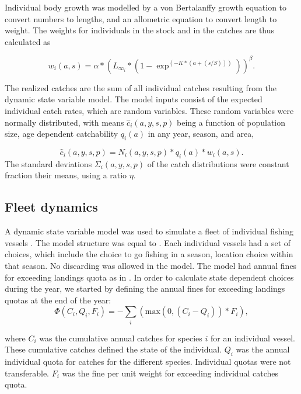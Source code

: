 \documentclass[12pt,oneline,a4paper,numbib]{ouparticle}
\numberwithin{equation}{subsection} %
\begin{document}
Individual body growth was modelled by a von Bertalanffy growth equation to convert numbers to lengths, and an allometric equation to convert length to weight. The weights for individuals in the stock and in the catches are thus calculated as

\begin{equation}
w_i(a,s) = \alpha * ( L_{\infty_i} * (1-\exp^{(-K * (a+(s/S)))}))^{\beta}.
\end{equation}

The realized catches are the sum of all individual catches resulting from the dynamic state variable model. The model inputs consist of the expected individual catch rates, which are random variables. These random variables were normally distributed, with means $\hat c_i (a, y, s, p)$ being a function of population size, age dependent catchability $q_i (a)$ in any year, season, and area,

\begin{equation}
\hat c_i (a, y, s, p) = N_i (a, y, s, p) * q_i (a) * w_i(a,s).
\end{equation}
The standard deviations $\Sigma_i (a, y, s, p)$ of the catch distributions were constant fraction their means, using a ratio $\eta$. 

\subsection{Fleet dynamics}

A dynamic state variable model was used to simulate a fleet of individual fishing vessels \cite{Alzorriz2018, Batsleer2015, ClarkandMangel2000, Dowling2011, Houston1999, Poos2010}. The model structure was equal to \cite{Alzorriz2018}. Each individual vessels had a set of choices, which include the choice to go fishing in a season, location choice within that season. No discarding was allowed in the model. The model had annual fines for exceeding landings quota as in \cite{Alzorriz2018}. In order to calculate state dependent choices during the year, we started by defining the annual fines for exceeding landings quotas at the end of the year:
\begin{equation}
\Phi (C_i, Q_i, F_i)= -\sum_i (\textrm{max}( 0, (C_i - Q_i))* F_i),
\end{equation}

where $C_i$ was the cumulative annual catches for species $i$ for an individual vessel. These cumulative catches defined the state of the individual. $Q_i$ was the annual individual quota for catches for the different species. Individual quotas were not transferable. $F_i$ was the fine per unit weight for exceeding individual catches quota.
\end{document}
